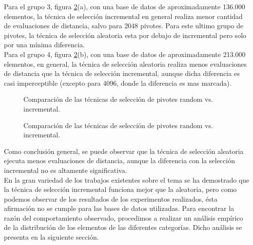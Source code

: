 Para el grupo 3, figura \ref{fig:ETS-2}(a), con una base de datos de aproximadamente 136.000 elementos, la t\'ecnica de selecci\'on incremental en general realiza menor cantidad de evaluaciones de distancia, salvo para 2048 pivotes. Para este ultimo grupo de pivotes, la t\'ecnica de selecci\'on aleatoria esta por debajo de incremental pero solo por una m\'inima diferencia.\\

Para el grupo 4, figura \ref{fig:ETS-2}(b), con una base de datos de aproximadamente 213.000 elementos, en general, la t\'ecnica de selecci\'on aleatoria realiza menos evaluaciones de distancia que la t\'ecnica de selecci\'on incremental, aunque dicha diferencia es casi imperceptible (excepto para 4096, donde la diferencia es mas marcada).\\


\begin{figure}[tb]
\centering
{}
\caption{\small Comparaci\'on de las t\'ecnicas de selecci\'on de pivotes random vs. incremental.}
\label{fig:ETS-1}
\end{figure}
\begin{figure}[tb]
\centering
{}
\caption{\small Comparaci\'on de las t\'ecnicas de selecci\'on de pivotes random vs. incremental.}
\label{fig:ETS-2}

\end{figure}

Como conclusi\'on general, se puede observar que la t\'ecnica de selecci\'on aleatoria ejecuta menos evaluaciones de distancia, aunque la diferencia con la selecci\'on incremental no es altamente significativa.\\

En la gran variedad de los trabajos existentes sobre el tema se ha demostrado que la t\'ecnica de selecci\'on incremental funciona mejor que la aleatoria, pero como podemos observar de los resultados de los experimentos realizados, \'esta afirmaci\'on no se cumple para las bases de datos utilizadas. Para encontrar la raz\'on del comportamiento observado, procedimos a realizar un an\'alisis emp\'irico de la distribuci\'on de los elementos de las diferentes categor\'ias. Dicho an\'alisis se presenta en la siguiente secci\'on.


